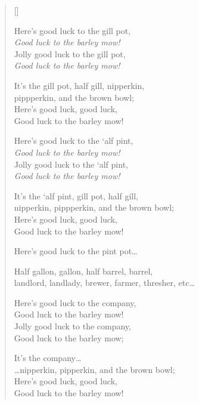 \pagebreak
\settowidth{\versewidth}{nipperkin, pippperkin, and the brown bowl;}
\begin{verse}[\versewidth]
\begin{altverse}
Here's good luck to the gill pot,\\
\textit{Good luck to the barley mow!}\\
Jolly good luck to the gill pot,\\
\textit{Good luck to the barley mow!}\\
\end{altverse}
It's the gill pot, half gill, nipperkin,\\
pippperkin, and the brown bowl;\\
Here's good luck, good luck,\\
Good luck to the barley mow!


\begin{altverse}
Here's good luck to the `alf pint,\\
\textit{Good luck to the barley mow!}\\
Jolly good luck to the `alf pint,\\
\textit{Good luck to the barley mow!}\\
\end{altverse}
It's the `alf pint, gill pot, half gill,\\
nipperkin, pippperkin, and the brown bowl;\\
Here's good luck, good luck,\\
Good luck to the barley mow!


Here's good luck to the pint pot\dots{}

Half gallon, gallon, half barrel, barrel,\\
landlord, landlady, brewer, farmer, thresher, etc\dots{}

\begin{altverse}
Here's good luck to the company,\\
Good luck to the barley mow!\\
Jolly good luck to the company,\\
Good luck to the barley mow;\\
\end{altverse}
It's the company\dots{}\\
\dots{}nipperkin, pipperkin, and the brown bowl;\\
Here's good luck, good luck,\\
Good luck to the barley mow!
\end{verse}
